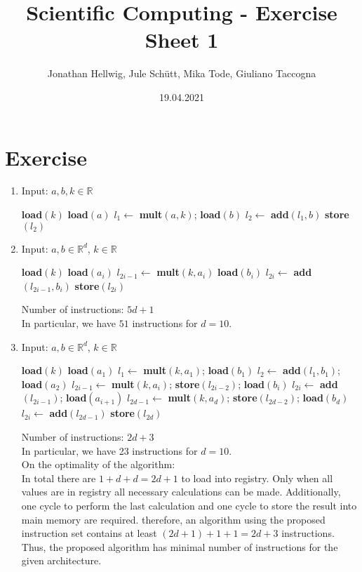 \documentclass{article}
\title{Scientific Computing - Exercise Sheet 1}
\author{Jonathan Hellwig, Jule Schütt, Mika Tode, Giuliano Taccogna}
\date{19.04.2021}
\begin{document}
\maketitle

\section{Exercise}
\begin{enumerate}[label=(\alph*)]
  \item Input: $ a,b,k \in \mathbb{R}$
    \begin{algorithmic}[1]
      \State \textbf{load}$(k)$
      \State \textbf{load}$(a)$
      \State $l_1 \gets $ \textbf{mult}$(a,k)$; \textbf{load}$(b)$
      \State $l_2 \gets $ \textbf{add}$(l_1, b)$
      \State \textbf{store}$(l_2)$
    \end{algorithmic}
  \item Input: $ a,b \in \mathbb{R}^d$, $k \in \mathbb{R}$
    \begin{algorithmic}[1]
      \State \textbf{load}$(k)$
      \State \textbf{load}$(a_i)$
      \State $l_{2i-1} \gets $ \textbf{mult}$(k, a_i)$
      \State \textbf{load}$(b_i)$
      \State $l_{2i} \gets $ \textbf{add}$(l_{2i-1}, b_i)$
      \State \textbf{store}$(l_{2i})$
      \EndFor
    \end{algorithmic}
    Number of instructions: $5d+1$ \\
    In particular, we have $51$ instructions for $d = 10$.
  \item Input: $ a,b \in \mathbb{R}^d$, $k \in \mathbb{R}$
    \begin{algorithmic}[1]
      \State \textbf{load}$(k)$
      \State \textbf{load}$(a_1)$
      \State $l_1 \gets $ \textbf{mult}$(k,a_1)$; \textbf{load}$(b_1)$
      \State $l_2 \gets $ \textbf{add}$(l_1, b_1)$; \textbf{load}$(a_2)$
      \State $l_{2i-1} \gets $ \textbf{mult}$(k,a_i)$; \textbf{store}$(l_{2i-2})$; \textbf{load}$(b_i)$
      \State $l_{2i} \gets $ \textbf{add}$(l_{2i-1})$; \textbf{load}$(a_{i+1})$
      \EndFor
      \State $l_{2d-1} \gets $ \textbf{mult}$(k,a_d)$; \textbf{store}$(l_{2d-2})$; \textbf{load}$(b_d)$
      \State $l_{2i} \gets $ \textbf{add}$(l_{2d-1})$
      \State \textbf{store}$(l_{2d})$
    \end{algorithmic}
    Number of instructions: $2d+3$ \\
    In particular, we have 23 instructions for $d = 10$. \\
    On the optimality of the algorithm: \\
    In total there are $1+d+d = 2d +1 $ to load into registry. Only when all values are in registry all necessary calculations can be made. Additionally, one cycle to perform the last calculation and one cycle to store the result into main memory are required. therefore, an algorithm using the proposed instruction set contains at least $(2d+1) + 1 + 1 = 2d + 3$ instructions. Thus, the proposed algorithm has minimal number of instructions for the given architecture. 


\end{enumerate}
\end{document}
